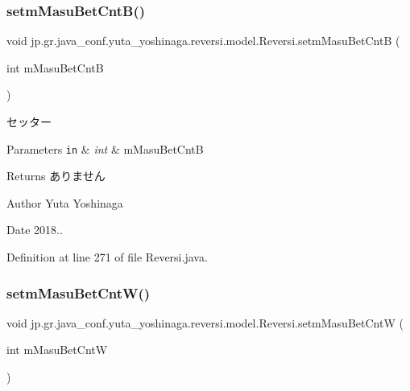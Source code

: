 \subsubsection{\texorpdfstring{setm\+Masu\+Bet\+Cnt\+B()}{setmMasuBetCntB()}}
{\footnotesize\ttfamily void jp.\+gr.\+java\+\_\+conf.\+yuta\+\_\+yoshinaga.\+reversi.\+model.\+Reversi.\+setm\+Masu\+Bet\+CntB (\begin{DoxyParamCaption}\item[{int}]{m\+Masu\+Bet\+CntB }\end{DoxyParamCaption})}



セッター 


\begin{DoxyParams}[1]{Parameters}
\mbox{\tt in}  & {\em int} & m\+Masu\+Bet\+CntB \\
\hline
\end{DoxyParams}
\begin{DoxyReturn}{Returns}
ありません 
\end{DoxyReturn}
\begin{DoxyAuthor}{Author}
Yuta Yoshinaga 
\end{DoxyAuthor}
\begin{DoxyDate}{Date}
2018.. 
\end{DoxyDate}


Definition at line 271 of file Reversi.\+java.

\mbox{\label{classjp_1_1gr_1_1java__conf_1_1yuta__yoshinaga_1_1reversi_1_1model_1_1_reversi_a724353a0a5f9b262f50f930bf992cf1f}} 
\subsubsection{\texorpdfstring{setm\+Masu\+Bet\+Cnt\+W()}{setmMasuBetCntW()}}
{\footnotesize\ttfamily void jp.\+gr.\+java\+\_\+conf.\+yuta\+\_\+yoshinaga.\+reversi.\+model.\+Reversi.\+setm\+Masu\+Bet\+CntW (\begin{DoxyParamCaption}\item[{int}]{m\+Masu\+Bet\+CntW }\end{DoxyParamCaption})}



